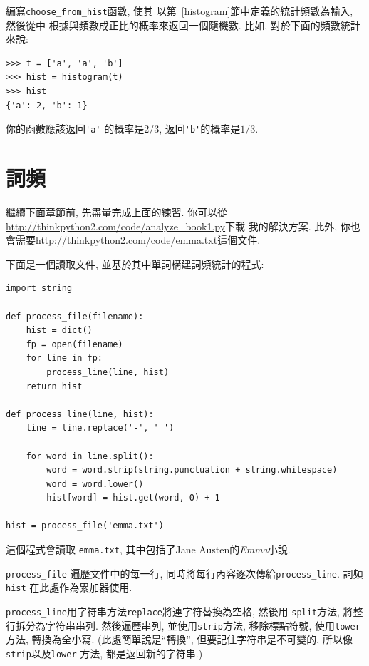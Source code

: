 \documentclass[10pt]{book}
\begin{document}
\begin{exercise}

編寫\verb"choose_from_hist"函數, 使其
以第~\ref{histogram}節中定義的統計頻數為輸入, 然後從中
根據與頻數成正比的概率來返回一個隨機數. 
比如, 對於下面的頻數統計來說:

\begin{verbatim}
>>> t = ['a', 'a', 'b']
>>> hist = histogram(t)
>>> hist
{'a': 2, 'b': 1}
\end{verbatim}
%
你的函數應該返回\verb"'a'" 的概率是$2/3$,  返回\verb"'b'"的概率是$1/3$.
\end{exercise}


\section{詞頻}

繼續下面章節前, 先盡量完成上面的練習. 
你可以從 \url{http://thinkpython2.com/code/analyze_book1.py}下載
我的解決方案. 此外, 你也會需要\url{http://thinkpython2.com/code/emma.txt}這個文件.

下面是一個讀取文件, 並基於其中單詞構建詞頻統計的程式:

\begin{verbatim}
import string

def process_file(filename):
    hist = dict()
    fp = open(filename)
    for line in fp:
        process_line(line, hist)
    return hist

def process_line(line, hist):
    line = line.replace('-', ' ')
    
    for word in line.split():
        word = word.strip(string.punctuation + string.whitespace)
        word = word.lower()
        hist[word] = hist.get(word, 0) + 1

hist = process_file('emma.txt')
\end{verbatim}
%
這個程式會讀取 {\tt emma.txt}, 其中包括了Jane Austen的{\em Emma}小說. 

\verb"process_file" 遍歷文件中的每一行, 同時將每行內容逐次傳給\verb"process_line". 
詞頻{\tt hist} 在此處作為累加器使用. 

\verb"process_line"用字符串方法{\tt replace}將連字符替換為空格, 然後用
 {\tt split}方法, 將整行拆分為字符串串列. 
然後遍歷串列, 並使用{\tt strip}方法, 移除標點符號, 使用{\tt lower}方法, 
轉換為全小寫. (此處簡單說是``轉換'', 但要記住字符串是不可變的, 所以像
{\tt strip}以及{\tt lower} 方法, 都是返回新的字符串.)
\end{document}
